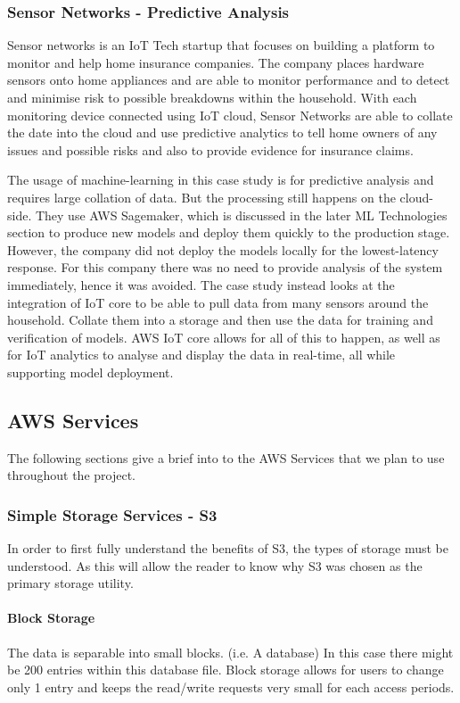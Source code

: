 \subsubsection{Sensor Networks - Predictive Analysis}
Sensor networks is an IoT Tech startup that focuses on building a platform to monitor and help home insurance companies. The company places hardware sensors onto home appliances and are able to monitor performance and to detect and minimise risk to possible breakdowns within the household\cite{ch1_2_case_study_2}. With each monitoring device connected using IoT cloud, Sensor Networks are able to collate the date into the cloud and use predictive analytics to tell home owners of any issues and possible risks and also to provide evidence for insurance claims. 

The usage of machine-learning in this case study is for predictive analysis and requires large collation of data. But the processing still happens on the cloud-side. They use AWS Sagemaker, which is discussed in the later ML Technologies section to produce new models and deploy them quickly to the production stage. However, the company did not deploy the models locally for the lowest-latency response. For this company there was no need to provide analysis of the system immediately, hence it was avoided. The case study instead looks at the integration of IoT core to be able to pull data from many sensors around the household. Collate them into a storage and then use the data for training and verification of models. AWS IoT core allows for all of this to happen, as well as for IoT analytics to analyse and display the data in real-time, all while supporting model deployment.

\subsection{AWS Services}
The following sections give a brief into to the AWS Services that we plan to use throughout the project.

\subsubsection{Simple Storage Services - S3}
In order to first fully understand the benefits of S3, the types of storage must be understood. As this will allow the reader to know why S3 was chosen as the primary storage utility.
\paragraph{Block Storage}
The data is separable into small blocks. (i.e. A database) In this case there might be 200 entries within this database file. Block storage allows for users to change only 1 entry and keeps the read/write requests very small for each access periods.
